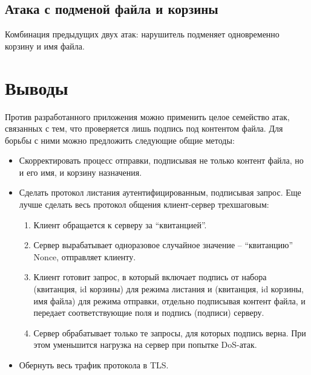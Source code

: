 \documentclass[a4paper,12pt]{article}
\begin{document}
\subsection{Атака с подменой файла и корзины}

Комбинация предыдущих двух атак: нарушитель подменяет одновременно корзину и имя файла.

\section*{Выводы}

Против разработанного приложения можно применить целое семейство атак, связанных с тем, что проверяется лишь подпись под контентом файла.
Для борьбы с ними можно предложить следующие общие методы:
\begin{itemize}
\item Скорректировать процесс отправки, подписывая не только контент файла, но и его имя, и корзину назначения.
 \item Сделать протокол листания аутентифицированным, подписывая запрос. Еще лучше сделать весь протокол общения клиент-сервер трехшаговым:
 \begin{enumerate}
 \item Клиент обращается к серверу за ``квитанцией''.
  \item Сервер вырабатывает одноразовое случайное значение -- ``квитанцию'' Nonce, отправляет клиенту.
  \item Клиент готовит запрос, в который включает подпись от набора (квитанция, id корзины) для режима листания и
  (квитанция, id корзины, имя файла) для режима отправки, отдельно подписывая контент файла, и передает соответствующие поля и подпись (подписи) серверу. 
  \item Сервер обрабатывает только те запросы, для которых подпись верна. При этом уменьшится нагрузка на сервер при попытке DoS-атак.
 \end{enumerate}
\item Обернуть весь трафик протокола в TLS.
 \end{itemize}
\end{document}
